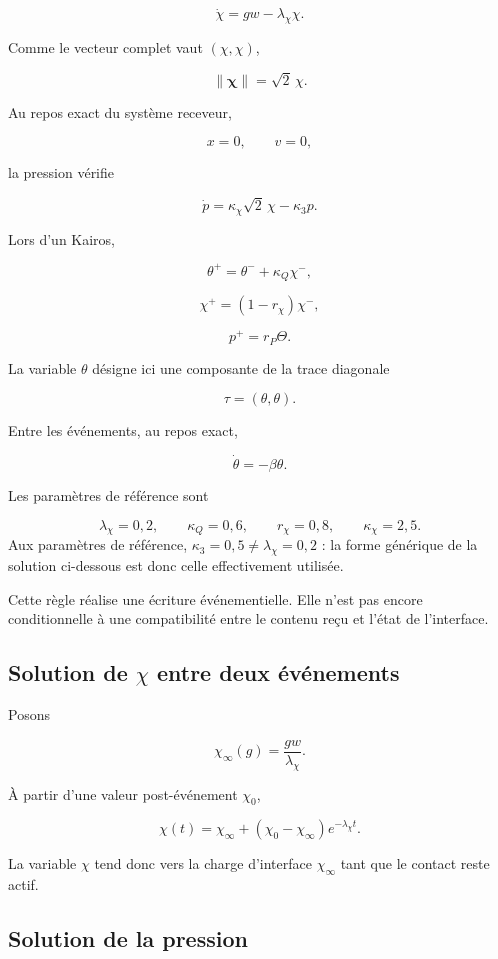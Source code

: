 \[
\dot\chi
=
gw-\lambda_\chi\chi.
\]

Comme le vecteur complet vaut \((\chi,\chi)\),

\[
\|\boldsymbol\chi\|
=
\sqrt2\,\chi.
\]

Au repos exact du système receveur,

\[
x=0,
\qquad
v=0,
\]

la pression vérifie

\[
\dot p
=
\kappa_\chi\sqrt2\,\chi
-
\kappa_3p.
\]

Lors d'un Kairos,

\[
\theta^+
=
\theta^-
+
\kappa_Q\chi^-,
\]

\[
\chi^+
=
(1-r_\chi)\chi^-,
\]

\[
p^+
=
r_P\Theta.
\]

La variable \(\theta\) désigne ici une composante de la trace
diagonale

\[
\tau=(\theta,\theta).
\]

Entre les événements, au repos exact,

\[
\dot\theta=-\beta\theta.
\]

Les paramètres de référence sont

\[
\lambda_\chi=0{,}2,
\qquad
\kappa_Q=0{,}6,
\qquad
r_\chi=0{,}8,
\qquad
\kappa_\chi=2{,}5.
\]
Aux paramètres de référence, \(\kappa_3=0{,}5\neq
\lambda_\chi=0{,}2\) : la forme générique de la solution ci-dessous
est donc celle effectivement utilisée.

Cette règle réalise une écriture événementielle. Elle n'est pas encore
conditionnelle à une compatibilité entre le contenu reçu et l'état de
l'interface.

\subsection{Solution de \texorpdfstring{$\chi$}{chi} entre deux événements}
\label{annexe-r2-solution-chi}

Posons

\[
\chi_\infty(g)
=
\frac{gw}{\lambda_\chi}.
\]

À partir d'une valeur post-événement \(\chi_0\),

\[
\boxed{
\chi(t)
=
\chi_\infty
+
\left(
\chi_0-\chi_\infty
\right)
e^{-\lambda_\chi t}.
}
\]

La variable \(\chi\) tend donc vers la charge d'interface
\(\chi_\infty\) tant que le contact reste actif.

\subsection{Solution de la pression}
\label{annexe-r2-solution-pression}

